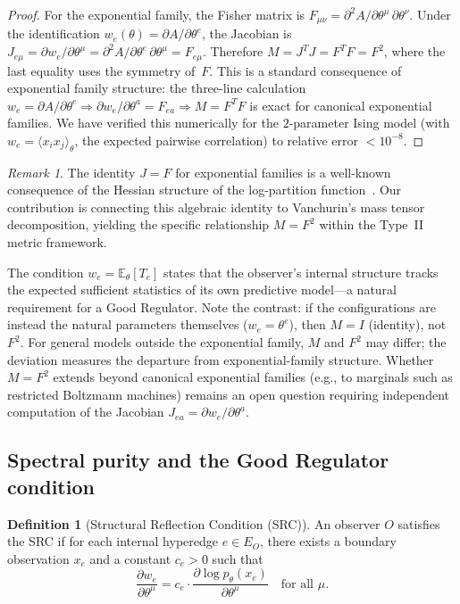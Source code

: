\documentclass[11pt]{article}
\theoremstyle{definition}
\newtheorem{definition}[theorem]{Definition}
\theoremstyle{remark}
\newtheorem{remark}[theorem]{Remark}
\begin{document}
\begin{proof}
For the exponential family, the Fisher matrix is
$F_{\mu\nu} = \partial^2 A / \partial\theta^\mu\, \partial\theta^\nu$.
Under the identification $w_e(\theta) = \partial A / \partial\theta^e$,
the Jacobian is
$J_{e\mu} = \partial w_e / \partial\theta^\mu
= \partial^2 A / \partial\theta^e\, \partial\theta^\mu = F_{e\mu}$.
Therefore $M = J^T J = F^T F = F^2$, where the last equality uses
the symmetry of~$F$.
This is a standard consequence of exponential family structure: the
three-line calculation $w_e = \partial A/\partial\theta^e \Rightarrow
\partial w_e/\partial\theta^a = F_{ea} \Rightarrow M = F^T F$ is exact
for canonical exponential families.
We have verified this numerically for the $2$-parameter Ising model
(with $w_e = \langle x_i x_j \rangle_\theta$, the expected
pairwise correlation) to relative error $< 10^{-8}$.
\end{proof}

\begin{remark}
The identity $J = F$ for exponential families is a well-known consequence
of the Hessian structure of the log-partition function~\cite{Amari2016}.
Our contribution is connecting this algebraic identity to Vanchurin's mass
tensor decomposition, yielding the specific relationship $M = F^2$ within
the Type~II metric framework.

The condition $w_e = \mathbb{E}_\theta[T_e]$ states that the observer's
internal structure tracks the expected sufficient statistics of its own
predictive model---a natural requirement for a Good Regulator.
Note the contrast: if the configurations are instead the natural
parameters themselves ($w_e = \theta^e$), then $M = I$ (identity),
not~$F^2$.
For general models outside the exponential family, $M$ and $F^2$
may differ; the deviation measures the departure from
exponential-family structure.
Whether $M = F^2$ extends beyond canonical exponential families
(e.g., to marginals such as restricted Boltzmann machines) remains
an open question requiring independent computation of the
Jacobian $J_{ea} = \partial w_e / \partial\theta^a$.
\end{remark}

\subsection{Spectral purity and the Good Regulator condition}
\label{sec:spectral-purity}

\begin{definition}[Structural Reflection Condition (SRC)]
\label{def:SRC}
An observer $O$ satisfies the SRC if for each internal hyperedge
$e \in E_O$, there exists a boundary observation $x_e$ and a constant
$c_e > 0$ such that
\[
\frac{\partial w_e}{\partial \theta^\mu} = c_e \cdot
\frac{\partial \log p_\theta(x_e)}{\partial \theta^\mu}
\quad \text{for all } \mu.
\]
\end{definition}
\end{document}
